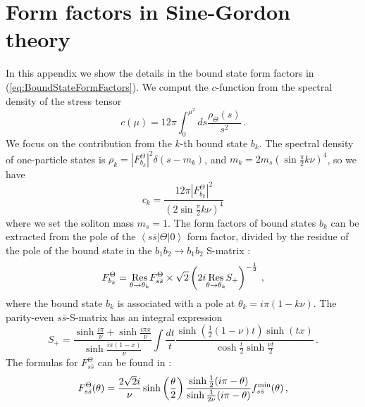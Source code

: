 \documentclass[12pt]{article}
\def\>{\rangle}
\def\<{\langle}
\begin{document}
\section{Form factors in Sine-Gordon theory}
    \label{sec:FormFactors}
    In this appendix we show the details in the bound state form factors in (\ref{eq:BoundStateFormFactors}).
    We comput the $c$-function from the spectral density of the stress tensor  
    \begin{equation}
    c(\mu) = 12\pi \int_0^{\mu^2} ds \frac{\rho_{\Theta}(s)}{s^2} \, .
    \end{equation}
    We focus on the contribution from the $k$-th bound state $b_k$. The spectral density of one-particle states is $\rho_k = |F_{b_k}^{\Theta}|^2 \delta(s-m_k)$, and $m_k = 2 m_s \left(\sin\frac{\pi}{2}k\nu\right)^4$, so we have
    \begin{equation}
    c_k = \frac{12\pi |F_{b_k}^{\Theta}|^2}{\left(2 \sin\frac{\pi}{2}k\nu\right)^4}
    \end{equation}
    where we set the soliton mass $m_s = 1$. The form factors of bound states $b_k$ can be extracted from the pole of the $\left\< s \bar s | \Theta | 0 \right\>$ form factor, divided by the residue of the pole of the bound state in the $b_1 b_2 \rightarrow b_1 b_2$ S-matrix \cite{Babujian:1998uw}:
    \begin{equation}
    F_{b_k}^{\Theta} = \underset{\theta\rightarrow\theta_{k}}{\rm Res} F_{s\bar s}^{\Theta} \times 
        \sqrt{2} \left( 2 i \underset{\theta\rightarrow\theta_{k}}{\rm Res} S_{+}\right)^{-\frac{1}{2}} \, ,
    \end{equation}
    where the bound state $b_k$ is associated with a pole at $\theta_k = i \pi (1-k\nu)$. 
    The parity-even $s \bar s$-S-matrix has an integral expression
    \begin{equation}
    S_{+} = \frac{\sinh \frac{i \pi }{\nu }+\sinh \frac{i \pi  x}{\nu }}{\sinh \frac{i \pi  (1-x)}{\nu }} \int \frac{dt}{t}\frac{\sinh \left(\frac{1}{2} (1-\nu ) t\right) \sinh (t x)}{ \cosh \frac{t}{2} \sinh \frac{\nu  t}{2} } \, .
    \end{equation}
    The formulas for $F_{s\bar s}^{\Theta}$ can be found in \cite{Babujian:2001xn}:
    \begin{equation}
    F_{s\bar s}^{\Theta} (\theta) = 
    \frac{2\sqrt{2}i}{\nu} 
    \sinh\left(\frac{\theta}{2}\right)
    \frac{\sinh\frac{1}{2}(i\pi-\theta)}{\sinh\frac{1}{2\nu}(i\pi-\theta)} f_{s\bar s}^{\rm min}(\theta)\, ,
    \end{equation}
\end{document}
